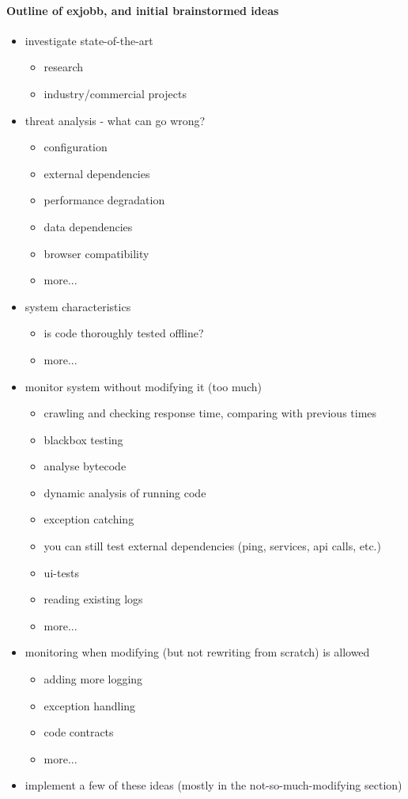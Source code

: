 \documentclass[a4paper,11pt]{kth-mag}
\begin{document}
\paragraph{Outline of exjobb, and initial brainstormed ideas}

\begin{itemize}
\item investigate state-of-the-art
	\begin{itemize}
	\item research
	\item industry/commercial projects
	\end{itemize}

\item threat analysis - what can go wrong?
	\begin{itemize}
	\item configuration
	\item external dependencies
	\item performance degradation
	\item data dependencies
	\item browser compatibility
	\item more...
	\end{itemize}

\item system characteristics
	\begin{itemize}
	\item is code thoroughly tested offline?
	\item more...
	\end{itemize}

\item monitor system without modifying it (too much)
	\begin{itemize}
	\item crawling and checking response time, comparing with previous times
	\item blackbox testing
	\item analyse bytecode
	\item dynamic analysis of running code
	\item exception catching
	\item you can still test external dependencies (ping, services, api calls, etc.)
	\item ui-tests
	\item reading existing logs
	\item more...
	\end{itemize}

\item monitoring when modifying (but not rewriting from scratch) is allowed
	\begin{itemize}
	\item adding more logging
	\item exception handling
	\item code contracts
	\item more...
	\end{itemize}

\item implement a few of these ideas (mostly in the not-so-much-modifying section)
\end{itemize}
\end{document}
